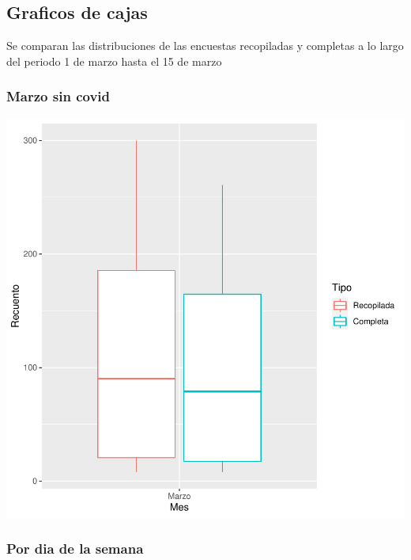 \documentclass{article}
\begin{document}
\subsection{Graficos de cajas}
Se comparan las distribuciones de las encuestas recopiladas y completas a lo largo del periodo 1 de marzo hasta el 15 de marzo

\subsubsection{Marzo sin covid}

\includegraphics{seguimento2-051}

\subsubsection{Por dia de la semana}
\end{document}
